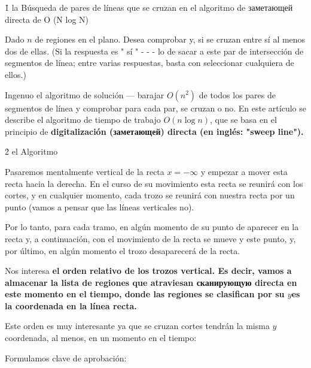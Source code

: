 \h1{ la Búsqueda de pares de líneas que se cruzan en el algoritmo de заметающей directa de O (N log N) }

Dado $n$ de regiones en el plano. Desea comprobar y, si se cruzan entre sí al menos dos de ellas. (Si la respuesta es " sí " - - - lo de sacar a este par de intersección de segmentos de línea; entre varias respuestas, basta con seleccionar cualquiera de ellos.)

Ingenuo el algoritmo de solución --- barajar $O (n^2)$ de todos los pares de segmentos de línea y comprobar para cada par, se cruzan o no. En este artículo se describe el algoritmo de tiempo de trabajo $O (n \log n)$, que se basa en el principio de \bf{digitalización (заметающей) directa} (en inglés: "sweep line").


\h2{ el Algoritmo }

Pasaremos mentalmente vertical de la recta $x = -\infty$ y empezar a mover esta recta hacia la derecha. En el curso de su movimiento esta recta se reunirá con los cortes, y en cualquier momento, cada trozo se reunirá con nuestra recta por un punto (vamos a pensar que las líneas verticales no).


Por lo tanto, para cada tramo, en algún momento de su punto de aparecer en la recta y, a continuación, con el movimiento de la recta se mueve y este punto, y, por último, en algún momento el trozo desaparecerá de la recta.

Nos interesa \bf{el orden relativo de los trozos} vertical. Es decir, vamos a almacenar la lista de regiones que atraviesan сканирующую directa en este momento en el tiempo, donde las regiones se clasifican por su $y$es la coordenada en la línea recta.


Este orden es muy interesante ya que se cruzan cortes tendrán la misma $y$coordenada, al menos, en un momento en el tiempo:


Formulamos clave de aprobación:

